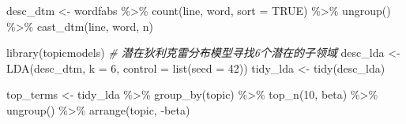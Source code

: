\documentclass[]{tufte-book}
\newenvironment{Shaded}{}{}
\newcommand{\AttributeTok}[1]{\textcolor[rgb]{0.49,0.56,0.16}{#1}}
\newcommand{\CommentTok}[1]{\textcolor[rgb]{0.38,0.63,0.69}{\textit{#1}}}
\newcommand{\ConstantTok}[1]{\textcolor[rgb]{0.53,0.00,0.00}{#1}}
\newcommand{\DecValTok}[1]{\textcolor[rgb]{0.25,0.63,0.44}{#1}}
\newcommand{\FunctionTok}[1]{\textcolor[rgb]{0.02,0.16,0.49}{#1}}
\newcommand{\NormalTok}[1]{#1}
\newcommand{\OtherTok}[1]{\textcolor[rgb]{0.00,0.44,0.13}{#1}}
\newcommand{\SpecialCharTok}[1]{\textcolor[rgb]{0.25,0.44,0.63}{#1}}
\begin{document}
\begin{Shaded}
\begin{Highlighting}[]
\NormalTok{desc\_dtm }\OtherTok{\textless{}{-}}\NormalTok{ wordfabs }\SpecialCharTok{\%\textgreater{}\%}
        \FunctionTok{count}\NormalTok{(line, word, }\AttributeTok{sort =} \ConstantTok{TRUE}\NormalTok{) }\SpecialCharTok{\%\textgreater{}\%}
        \FunctionTok{ungroup}\NormalTok{() }\SpecialCharTok{\%\textgreater{}\%}
        \FunctionTok{cast\_dtm}\NormalTok{(line, word, n)}

\FunctionTok{library}\NormalTok{(topicmodels)}
\CommentTok{\# 潜在狄利克雷分布模型寻找6个潜在的子领域}
\NormalTok{desc\_lda }\OtherTok{\textless{}{-}} \FunctionTok{LDA}\NormalTok{(desc\_dtm, }\AttributeTok{k =} \DecValTok{6}\NormalTok{, }\AttributeTok{control =} \FunctionTok{list}\NormalTok{(}\AttributeTok{seed =} \DecValTok{42}\NormalTok{))}
\NormalTok{tidy\_lda }\OtherTok{\textless{}{-}} \FunctionTok{tidy}\NormalTok{(desc\_lda)}

\NormalTok{top\_terms }\OtherTok{\textless{}{-}}\NormalTok{ tidy\_lda }\SpecialCharTok{\%\textgreater{}\%}
  \FunctionTok{group\_by}\NormalTok{(topic) }\SpecialCharTok{\%\textgreater{}\%}
  \FunctionTok{top\_n}\NormalTok{(}\DecValTok{10}\NormalTok{, beta) }\SpecialCharTok{\%\textgreater{}\%}
  \FunctionTok{ungroup}\NormalTok{() }\SpecialCharTok{\%\textgreater{}\%}
  \FunctionTok{arrange}\NormalTok{(topic, }\SpecialCharTok{{-}}\NormalTok{beta)}


\end{Highlighting}
\end{Shaded}
\end{document}
